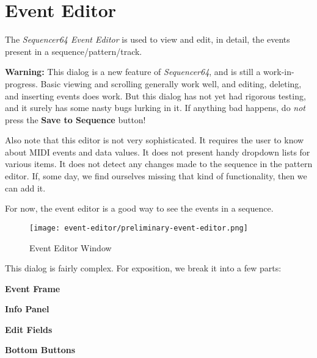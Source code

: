%
%

\section{Event Editor}
\label{sec:seq64_event_editor}

   The \textsl{Sequencer64 Event Editor} is used to view and edit,
   in detail, the events present in a sequence/pattern/track.

   \textbf{Warning:}
   This dialog is a new feature of \textsl{Sequencer64}, and is
   still a work-in-progress.  Basic viewing and scrolling generally work well,
   and editing, deleting, and inserting events does work.
   But this dialog has not yet had rigorous testing, and it surely
   has some nasty bugs lurking in it.
   If anything bad happens, do \textsl{not} press the
   \textbf{Save to Sequence} button!

   Also note that this editor is not very sophisticated.  It requires the user
   to know about MIDI events and data values.  It does not present handy
   dropdown lists for various items.
   It does not detect any changes made to the sequence in the pattern editor.
   If, some day, we find ourselves missing
   that kind of functionality, then we can add it.

   For now, the event editor is a good way to see the events in a sequence.

\begin{figure}[H]
   \centering 
   \texttt{[image: event-editor/preliminary-event-editor.png]}
   \caption{Event Editor Window}
   \label{fig:event_editor_window}
\end{figure}

   This dialog is fairly complex.
   For exposition, we break it into a few parts:

   \begin{enumber}
      \item \textbf{Event Frame}
      \item \textbf{Info Panel}
      \item \textbf{Edit Fields}
      \item \textbf{Bottom Buttons}
   \end{enumber}

